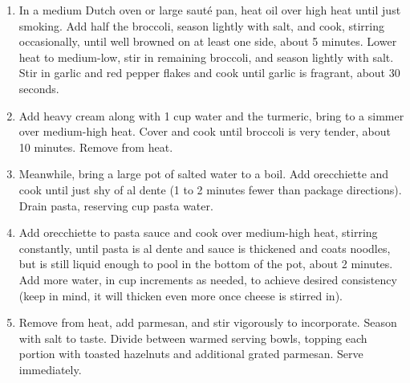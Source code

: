 \begin{enumerate}
    \item In a medium Dutch oven or large sauté pan, heat oil over high heat until just smoking. Add half the broccoli, season lightly with salt, and cook, stirring occasionally, until well browned on at least one side, about 5 minutes. Lower heat to medium-low, stir in remaining broccoli, and season lightly with salt. Stir in garlic and red pepper flakes and cook until garlic is fragrant, about 30 seconds.
    \item Add heavy cream along with 1 cup water and the turmeric, bring to a simmer over medium-high heat. Cover and cook until broccoli is very tender, about 10 minutes. Remove from heat.
    \item Meanwhile, bring a large pot of salted water to a boil. Add orecchiette and cook until just shy of al dente (1 to 2 minutes fewer than package directions). Drain pasta, reserving  cup pasta water.
    \item Add orecchiette to pasta sauce and cook over medium-high heat, stirring constantly, until pasta is al dente and sauce is thickened and coats noodles, but is still liquid enough to pool in the bottom of the pot, about 2 minutes. Add more water, in  cup increments as needed, to achieve desired consistency (keep in mind, it will thicken even more once cheese is stirred in).
    \item Remove from heat, add parmesan, and stir vigorously to incorporate. Season with salt to taste. Divide between warmed serving bowls, topping each portion with toasted hazelnuts and additional grated parmesan. Serve immediately.
\end{enumerate}

